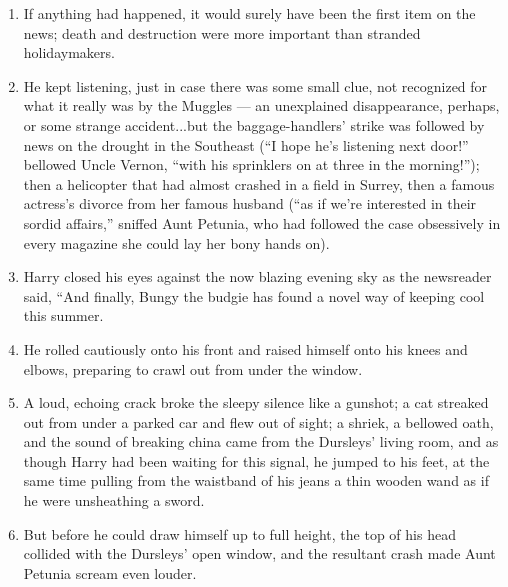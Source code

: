 \begin{enumerate}
	\item If anything had happened, it would surely have been the first item on the news; death and destruction were more important than stranded holidaymakers.
	
	\item He kept listening, just in case there was some small clue, not recognized for what it really was by the Muggles --- an unexplained disappearance, perhaps, or some strange accident...but the baggage-handlers' strike was followed by news on the drought in the Southeast (``I hope he's listening next door!'' bellowed Uncle Vernon, ``with his sprinklers on at three in the morning!''); then a helicopter that had almost crashed in a field in Surrey, then a famous actress's divorce from her famous husband (``as if we're interested in their sordid affairs,'' sniffed Aunt Petunia, who had followed the case obsessively in every magazine she could lay her bony hands on).
	
	\item Harry closed his eyes against the now blazing evening sky as the newsreader said, ``And finally, Bungy the budgie has found a novel way of keeping cool this summer.
	
	\item He rolled cautiously onto his front and raised himself onto his knees and elbows, preparing to crawl out from under the window.
	
	\item A loud, echoing crack broke the sleepy silence like a gunshot; a cat streaked out from under a parked car and flew out of sight; a shriek, a bellowed oath, and the sound of breaking china came from the Dursleys' living room, and as though Harry had been waiting for this signal, he jumped to his feet, at the same time pulling from the waistband of his jeans a thin wooden wand as if he were unsheathing a sword.
	
	\item But before he could draw himself up to full height, the top of his head collided with the Dursleys' open window, and the resultant crash made Aunt Petunia scream even louder.
\end{enumerate}
